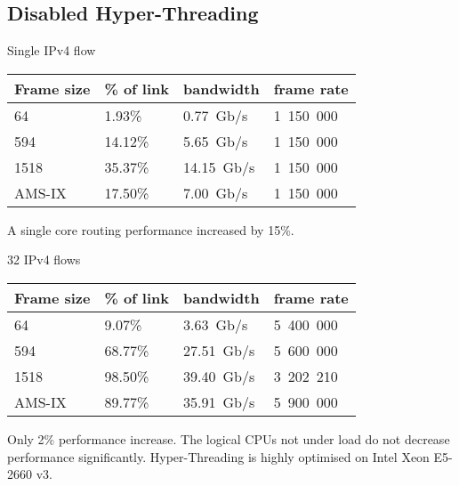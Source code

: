 
\subsection{Disabled Hyper-Threading}
Single IPv4 flow \\
\begin{tabular}{ | l | l | l | l | }
\hline
Frame size & \% of link & bandwidth & frame rate \\
\hline
64     &  1.93\% &  0.77~Gb/s & 1~150~000 \\
594    & 14.12\% &  5.65~Gb/s & 1~150~000 \\
1518   & 35.37\% & 14.15~Gb/s & 1~150~000 \\
AMS-IX & 17.50\% &  7.00~Gb/s & 1~150~000 \\
\hline
\end{tabular}
A single core routing performance increased by 15\%.

32 IPv4 flows \\
\begin{tabular}{ | l | l | l | l | }
\hline
Frame size & \% of link & bandwidth & frame rate \\
\hline
64     &  9.07\% &  3.63~Gb/s & 5~400~000 \\
594    & 68.77\% & 27.51~Gb/s & 5~600~000 \\
1518   & 98.50\% & 39.40~Gb/s & 3~202~210 \\
AMS-IX & 89.77\% & 35.91~Gb/s & 5~900~000 \\
\hline
\end{tabular}
Only 2\% performance increase.
The logical CPUs not under load do not decrease performance significantly.
Hyper-Threading is highly optimised on Intel Xeon E5-2660 v3.
